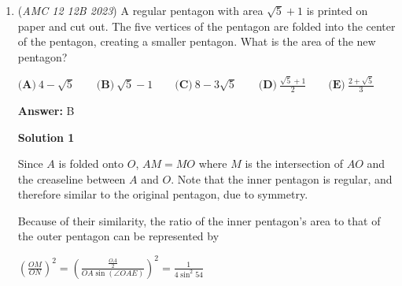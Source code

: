 \begin{enumerate}
 Thus, the only possible nontrivial common factor among $a$, $b$, $c$, $d$ is 3.

 Therefore,

 
$\gcd(a,b,c,d) = \boxed {3}.$




\textbf{Solution 3 (Pure Arithmetic)}

For simplicity, let $\gcd(a_1, \dots, a_k) = (a_1, \dots, a_k)$ and $\operatorname{lcm}(a_1, \dots, a_k) = [a_1, \dots, a_k]$.

 First, we can convert $(a, b, c, d)$ into $((a, b), (c, d))$.

 According to the theorem $(x, y)[x, y] = xy$ (for integers $x, y > 0$), we have:
 \[(a, b, c, d) = ((a, b), (c, d)) = \frac{(a, b)(c, d)}{[(a, b), (c, d)]} = \frac{\frac{ab}{[a, b]} \cdot \frac{cd}{[c, d]}}{[(a, b), (c, d)]} = \frac{abcd}{[a, b] \cdot [c, d] \cdot [(a, b), (c, d)]}\]

 Since $[(a, b), (c, d)] = ([a, c], [a, d], [b, c], [b, d])$, we can get 
 \[(a, b, c, d) = \frac{abcd}{[a, b] \cdot [c, d] \cdot ([a, c], [a, d], [b, c], [b, d])}\]

 Substituting the values gives 
 \[(a, b, c, d) = 3\]

 Therefore, the answer is $\boxed{\textbf{(C) 3}}$.

 


	\item (\textit{AMC 12 12B 2023}) A regular pentagon with area $\sqrt{5}+1$ is printed on paper and cut out. The five vertices of the pentagon are folded into the center of the pentagon, creating a smaller pentagon. What is the area of the new pentagon?


 $\textbf{(A)}~4-\sqrt{5}\qquad\textbf{(B)}~\sqrt{5}-1\qquad\textbf{(C)}~8-3\sqrt{5}\qquad\textbf{(D)}~\frac{\sqrt{5}+1}{2}\qquad\textbf{(E)}~\frac{2+\sqrt{5}}{3}$

 \textbf{Answer: }B



\textbf{Solution 1}

Since $A$ is folded onto $O$, $AM = MO$ where $M$ is the intersection of $AO$ and the creaseline between $A$ and $O$. Note that the inner pentagon is regular, and therefore similar to the original pentagon, due to symmetry.

 Because of their similarity, the ratio of the inner pentagon's area to that of the outer pentagon can be represented by 

 $\left(\frac{OM}{ON}\right)^{2} = \left(\frac{\frac{OA}{2}}{OA\sin (\angle OAE)}\right)^{2} = \frac{1}{4\sin^{2}54}$ 


\end{enumerate}
